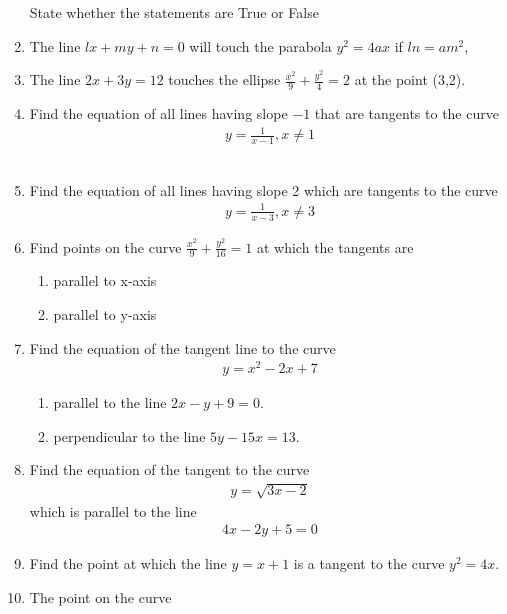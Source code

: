 \begin{enumerate}[label=\thesubsection.\arabic*,ref=\thesubsection.\theenumi]
State whether the statements are True or False 
\item The line $lx+my+n=0$ will touch the parabola $y^2=4 ax$ if $ln =am^2$,
\item The line $2x+3y=12$ touches the ellipse $\frac{x^2}{9}+\frac{y^2}{4}=2$ at the point (3,2).
\item 
Find the equation of all lines having slope  $-1$ that are tangents to the curve
\begin{align}
y = \frac{1}{x-1}, x \neq 1
\label{chapters/12/6/3/10}
\end{align}
	\\
	\solution 

\item 
Find the equation of all lines having slope 2 which are tangents to the curve 
\begin{align}
y=\frac{1}{x-3}, x\neq{3} 
\end{align}
\item 
 Find points on the curve $\frac{x^2}{9}+\frac{y^2}{16}=1$ at which the tangents are 
 \begin{enumerate}
	 \item parallel to x-axis\\  
	 \item parallel to y-axis
 \end{enumerate}
 \solution 
\label{chapters/12/6/3/13}

\item 
Find the equation of the tangent line to the curve
\begin{align}
y=x^2-2x+7
\end{align}
\begin{enumerate}
    \item parallel to the line $2x-y+9=0$.
    \item perpendicular to the line $5y-15x=13$.
\end{enumerate}
\item 
Find the equation of the tangent to the curve 
\begin{align}
	y = \sqrt{3x-2}
\end{align}
which is parallel to the line
\begin{align}
	4x-2y+5 = 0
\end{align}
\item 
Find the point at which the line $y = x + 1$ is a tangent to the curve $y^2 = 4x$.
    \item The point on the curve 
\label{chapters/12/6/5/27}
    \begin{align}

\end{align}
\end{enumerate}
